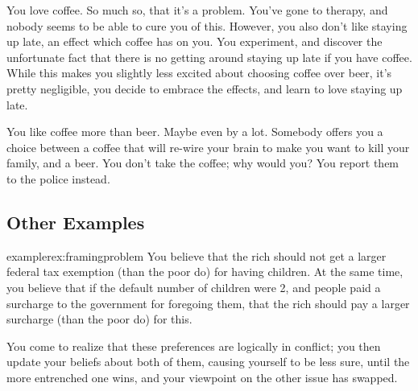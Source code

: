 \documentclass{article}
\begin{document}
	\begin{example}
		You love coffee. So much so, that it's a problem. You've gone to therapy, and nobody seems to be able to cure you of this. However, you also don't like staying up late, an effect which coffee has on you. You experiment, and discover the unfortunate fact that there is no getting around staying up late if you have coffee. While this makes you slightly less excited about choosing coffee over beer, it's pretty negligible, you decide to embrace the effects, and learn to love staying up late.
	\end{example}

	\begin{example}
		You like coffee more than beer. Maybe even by a lot. Somebody offers you a choice between a coffee that will re-wire your brain to make you want to kill your family, and a beer. You don't take the coffee; why would you? You report them to the police instead.
	\end{example}

	\subsection{Other Examples}
	\begin{restatable}{example}{rex:framingproblem}\label{rex:framingproblem}
		You believe that the rich should not get a larger federal tax exemption (than the poor do) for having children.
		At the same time, you believe that if the default number of children were 2, and people paid a surcharge to the government for foregoing them, that the rich should pay a larger surcharge (than the poor do) for this.
		
		You come to realize that these preferences are logically in conflict; you then update your beliefs about both of them, causing yourself to be less sure, until the more entrenched one wins, and your viewpoint on the other issue has swapped.
	\end{restatable}
\end{document}
